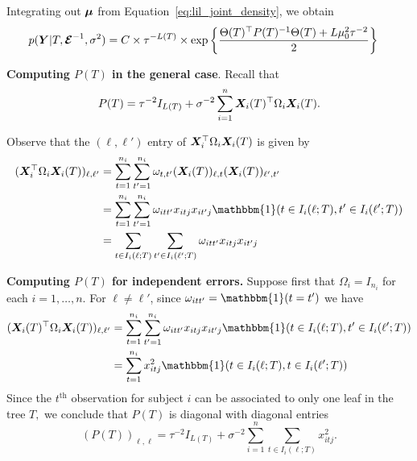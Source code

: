 \documentclass[11pt]{article}
\begin{document}
Integrating out $\boldsymbol{\mu}$ from Equation~\eqref{eq:lil_joint_density}, we obtain
\begin{align*}
p(\bm{Y} \vert T, \boldsymbol{\mathcal{E}}^{-1}, \sigma^{2}) &= C \times \tau^{-L(T)} \times \exp\left\{\frac{\Theta(T)^{\top}P(T)^{-1}\Theta(T) + L\mu_{0}^{2}\tau^{-2}}{2}\right\}
\end{align*}

\textbf{Computing $P(T)$ in the general case}. Recall that
$$
P(T) = \tau^{-2}I_{L(T)} + \sigma^{-2}\sum_{i = 1}^{n}{\bm{X}_{i}(T)^{\top}\Omega_{i}\bm{X}_{i}(T)}.
$$

Observe that the $(\ell, \ell')$ entry of $\bm{X}_{i}^{\top}\Omega_{i}\bm{X}_{i}(T)$ is given by
\begin{align*}
(\bX_{i}^{\top}\Omega_{i}\bX_{i}(T))_{\ell,\ell'} &= \sum_{t = 1}^{n_{i}}{\sum_{t' = 1}^{n_{i}}{\omega_{t,t'}(\bX_{i}(T))_{\ell,t}(\bX_{i}(T))_{\ell',t'}}} \\
&= \sum_{t = 1}^{n_{i}}{\sum_{t' = 1}^{n_{i}}{\omega_{itt'}x_{itj}x_{it'j}\mathbbm{1}(t \in I_{i}(\ell;T), t' \in I_{i}(\ell';T))}} \\
&= \sum_{t \in I_{i}(\ell;T)}{\sum_{t' \in I_{i}(\ell';T)}{\omega_{itt'}x_{itj}x_{it'j}}}
\end{align*}



\textbf{Computing $P(T)$ for independent errors.} 
Suppose first that $\Omega_{i} = I_{n_{i}}$ for each $i = 1, \ldots, n.$
For $\ell \neq \ell'$, since $\omega_{itt'} = \mathbbm{1}(t = t')$ we have
\begin{align*}
(\bX_{i}(T)^{\top}\Omega_{i}\bX_{i}(T))_{\ell,\ell'} &= \sum_{t = 1}^{n_{i}}{\sum_{t' = 1}^{n_{i}}{\omega_{itt'}x_{itj}x_{it'j}\mathbbm{1}(t \in I_{i}(\ell;T), t' \in I_{i}(\ell';T))}} \\
&= \sum_{t = 1}^{n_{i}}{x_{itj}^{2}\mathbbm{1}(t \in I_{i}(\ell;T), t \in I_{i}(\ell';T))} \\
\end{align*}
Since the $t^{\text{th}}$ observation for subject $i$ can be associated to only one leaf in the tree $T,$ we conclude that $P(T)$ is diagonal with diagonal entries
$$
(P(T))_{\ell,\ell} = \tau^{-2}I_{L(T)} + \sigma^{-2}\sum_{i = 1}^{n}{\sum_{t \in I_{i}(\ell;T)}{x_{itj}^{2}}}.
$$
\end{document}
